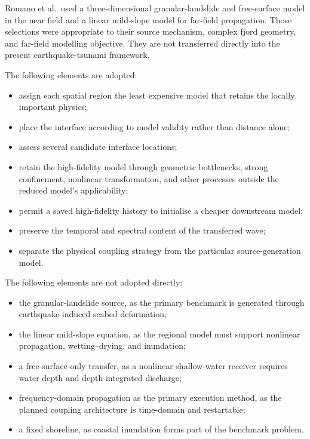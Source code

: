 Romano et al.\ used a three-dimensional granular-landslide and
free-surface model in the near field and a linear mild-slope model for
far-field propagation. Those selections were appropriate to their
source mechanism, complex fjord geometry, and far-field modelling
objective. They are not transferred directly into the present
earthquake-tsunami framework.

The following elements are adopted:

\begin{itemize}
  \item assign each spatial region the least expensive model that
    retains the locally important physics;
  \item place the interface according to model validity rather than
    distance alone;
  \item assess several candidate interface locations;
  \item retain the high-fidelity model through geometric bottlenecks,
    strong confinement, nonlinear transformation, and other
    processes outside the reduced model's applicability;
  \item permit a saved high-fidelity history to initialise a cheaper
    downstream model;
  \item preserve the temporal and spectral content of the transferred
    wave;
  \item separate the physical coupling strategy from the particular
    source-generation model.
\end{itemize}

The following elements are not adopted directly:

\begin{itemize}
  \item the granular-landslide source, as the primary benchmark is
    generated through earthquake-induced seabed deformation;
  \item the linear mild-slope equation, as the regional model must
    support nonlinear propagation, wetting--drying, and
    inundation;
  \item a free-surface-only transfer, as a nonlinear shallow-water
    receiver requires water depth and depth-integrated discharge;
  \item frequency-domain propagation as the primary execution method,
    as the planned coupling architecture is time-domain and
    restartable;
  \item a fixed shoreline, as coastal inundation forms part of the
    benchmark problem.
\end{itemize}

